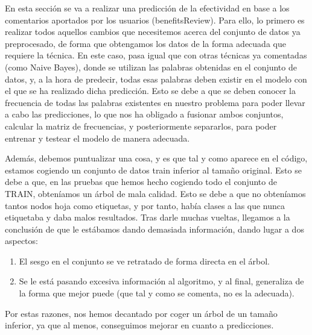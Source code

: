 \documentclass[spanish,]{article}
\providecommand{\tightlist}{%
  \setlength{\itemsep}{0pt}\setlength{\parskip}{0pt}}
\begin{document}
En esta sección se va a realizar una predicción de la efectividad en
base a los comentarios aportados por los usuarios (benefitsReview). Para
ello, lo primero es realizar todos aquellos cambios que necesitemos
acerca del conjunto de datos ya preprocesado, de forma que obtengamos
los datos de la forma adecuada que requiere la técnica. En este caso,
pasa igual que con otras técnicas ya comentadas (como Naive Bayes),
donde se utilizan las palabras obtenidas en el conjunto de datos, y, a
la hora de predecir, todas esas palabras deben existir en el modelo con
el que se ha realizado dicha predicción. Esto se debe a que se deben
conocer la frecuencia de todas las palabras existentes en nuestro
problema para poder llevar a cabo las predicciones, lo que nos ha
obligado a fusionar ambos conjuntos, calcular la matriz de frecuencias,
y posteriormente separarlos, para poder entrenar y testear el modelo de
manera adecuada.

Además, debemos puntualizar una cosa, y es que tal y como aparece en el
código, estamos cogiendo un conjunto de datos train inferior al tamaño
original. Esto se debe a que, en las pruebas que hemos hecho cogiendo
todo el conjunto de TRAIN, obteníamos un árbol de mala calidad. Esto se
debe a que no obteníamos tantos nodos hoja como etiquetas, y por tanto,
había clases a las que nunca etiquetaba y daba malos resultados. Tras
darle muchas vueltas, llegamos a la conclusión de que le estábamos dando
demasiada información, dando lugar a dos aspectos:

\begin{enumerate}
\def\labelenumi{\arabic{enumi}.}
\tightlist
\item
  El sesgo en el conjunto se ve retratado de forma directa en el árbol.
\item
  Se le está pasando excesiva información al algoritmo, y al final,
  generaliza de la forma que mejor puede (que tal y como se comenta, no
  es la adecuada).
\end{enumerate}

Por estas razones, nos hemos decantado por coger un árbol de un tamaño
inferior, ya que al menos, conseguimos mejorar en cuanto a predicciones.
\end{document}
